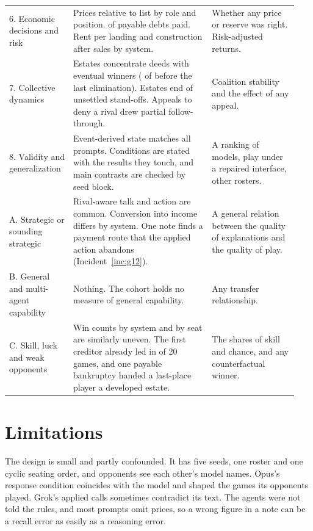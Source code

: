 \begin{longtable}{@{}L{0.20\linewidth}L{0.45\linewidth}L{0.29\linewidth}@{}}
6. Economic decisions and risk & Prices relative to list by role and position.  of  payable debts paid. Rent per landing and construction after sales by system. & Whether any price or reserve was right. Risk-adjusted returns.\\
7. Collective dynamics & Estates concentrate deeds with eventual winners ( of  before the last elimination). Estates end  of  unsettled stand-offs. Appeals to deny a rival drew partial follow-through. & Coalition stability and the effect of any appeal.\\
8. Validity and generalization & Event-derived state matches all  prompts. Conditions are stated with the results they touch, and main contrasts are checked by seed block. & A ranking of models, play under a repaired interface, other rosters.\\
\midrule
A. Strategic or sounding strategic & Rival-aware talk and action are common. Conversion into income differs by system. One note finds a payment route that the applied action abandons (Incident~\ref{inc:g12}). & A general relation between the quality of explanations and the quality of play.\\
B. General and multi-agent capability & Nothing. The cohort holds no measure of general capability. & Any transfer relationship.\\
C. Skill, luck and weak opponents & Win counts by system and by seat are similarly uneven. The first creditor already led in  of 20 games, and one payable bankruptcy handed a last-place player a developed estate. & The shares of skill and chance, and any counterfactual winner.\\
\end{longtable}
\endgroup

\section{Limitations}
\label{sec:limits}

The design is small and partly confounded. It has five seeds, one roster and one cyclic seating order, and opponents see each other's model names. Opus's response condition coincides with the model and shaped the games its opponents played. Grok's applied calls sometimes contradict its text. The agents were not told the rules, and most prompts omit prices, so a wrong figure in a note can be a recall error as easily as a reasoning error.

